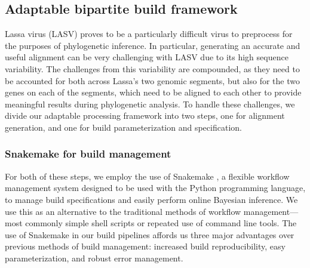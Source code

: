 \subsection{Adaptable bipartite build framework}

Lassa virus (LASV) proves to be a particularly difficult virus to preprocess for the purposes of phylogenetic inference.
In particular, generating an accurate and useful alignment can be very challenging with LASV due to its high sequence variability.
The challenges from this variability are compounded, as they need to be accounted for both across Lassa's two genomic segments, but also for the two genes on each of the segments, which need to be aligned to each other to provide meaningful results during phylogenetic analysis.
To handle these challenges, we divide our adaptable processing framework into two steps, one for alignment generation, and one for build parameterization and specification.

\subsubsection{Snakemake for build management}

For both of these steps, we employ the use of Snakemake \cite{koster2012snakemake}, a flexible workflow management system designed to be used with the Python programming language, to manage build specifications and easily perform online Bayesian inference.
We use this as an alternative to the traditional methods of workflow management---most commonly simple shell scripts or repeated use of command line tools.
The use of Snakemake in our build pipelines affords us three major advantages over previous methods of build management: increased build reproducibility, easy parameterization, and robust error management.

